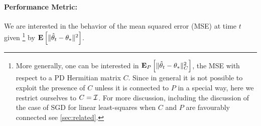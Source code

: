 \paragraph{Performance Metric:}  
We are interested in the behavior of the mean squared error (MSE) at time $t$ given%
\footnote{More generally, one can be interested in $\mathbf{E}_P\left[\| \hat{\theta}_t-\theta_*\|_C^2\right]$, the MSE with respect to a PD Hermitian matrix $C$. Since in general it is not possible to exploit the presence of $C$ unless it is connected to $P$ in a special way,
here we restrict ourselves to $C = \mathcal{I}$. For more discussion, including the discussion of the case of SGD for linear least-squares when $C$ and $P$ are favourably connected see \cref{sec:related}.}
 by $\mathbf{E}\left[\| \hat{\theta}_t-\theta_*\|^2\right]$. 
\begin{comment}
\footnote{We note here that $\E[\normsm{\thh_t-\ts}_C^2]$, which measures the MSE in the quadratic norm with respect to a positive definite matrix $C\succ 0$. However, unless $C$ has some special structure, it is not possible to exploit this generality in our bounds. Further, when data is bounded $\norm{C}^2$ is also bounded and it is straightforward to see that $\EEP{\norm{\thh_t-\ts}}^2_C\leq \norm{C}^2\EEP{\norm{\thh_t-\ts}^2}$. So, for the purpose of stating our results we will not use the general quadratic norm, however, will use it when we discuss the work by \cite{bach} in LSE, where its usage is relevant.}
\end{comment}
{}
